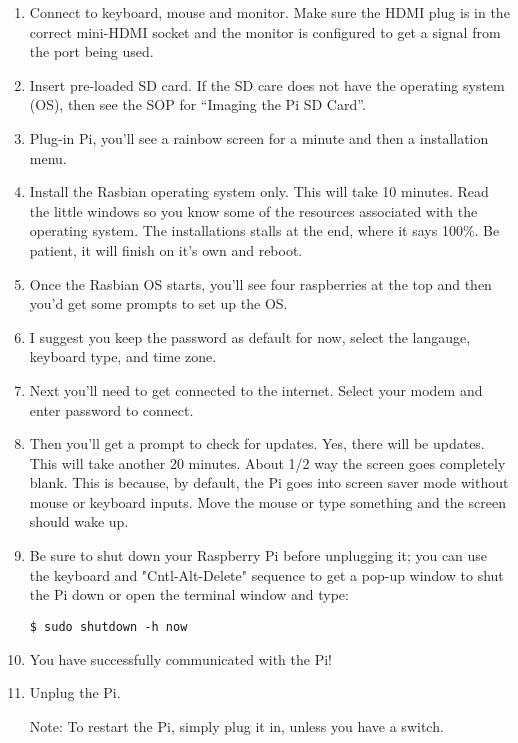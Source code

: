 \documentclass{article}\usepackage[]{graphicx}\usepackage[]{color}
\begin{document}
\begin{enumerate}

\item Connect to keyboard, mouse and monitor. Make sure the HDMI plug is in the correct mini-HDMI socket and the monitor is configured to get a signal from the port being used. 
\item Insert pre-loaded SD card. If the SD care does not have the operating system (OS), then see the SOP for ``Imaging the Pi SD Card''. 

\item Plug-in Pi, you'll see a rainbow screen for a minute and then a installation menu. 

\item Install the Rasbian operating system only. This will take 10 minutes. Read the little windows so you know some of the resources associated with the operating system. The installations stalls at the end, where it says 100\%. Be patient, it will finish on it's own and reboot.

\item Once the Rasbian OS starts, you'll see four raspberries at the top and then you'd get some prompts to set up the OS. 

\item I suggest you keep the password as default for now, select the langauge, keyboard type, and time zone. 

\item Next you'll need to get connected to the internet. Select your modem and enter password to connect.

\item Then you'll get a prompt to check for updates. Yes, there will be updates. This will take another 20 minutes. About 1/2 way the screen goes completely blank. This is because, by default, the Pi goes into screen saver mode without mouse or keyboard inputs. Move the mouse or type something and the screen should wake up. 

\item Be sure to shut down your Raspberry Pi before unplugging it; you can use the keyboard and "Cntl-Alt-Delete" sequence to get a pop-up window to shut the Pi down or open the terminal window and type:

\begin{lstlisting}
$ sudo shutdown -h now
\end{lstlisting}

\item You have successfully communicated with the Pi!  

\item Unplug the Pi.

Note: To restart the Pi, simply plug it in, unless you have a switch. 

\end{enumerate}
\end{document}
